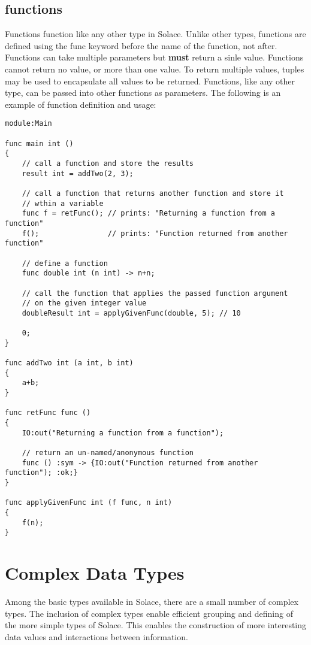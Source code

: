 \documentclass{article}
\begin{document}
\subsection{functions}

Functions function like any other type in Solace. Unlike other types, functions are
defined using the func keyword before the name of the function, not after. Functions
can take multiple parameters but \textbf{must} return a sinle value. Functions cannot return
no value, or more than one value. To return multiple values, tuples may be used to
encapsulate all values to be returned.
Functions, like any other type, can be passed into other functions as parameters.
The following is an example of function definition and usage:

\begin{lstlisting}
module:Main

func main int ()
{
	// call a function and store the results
	result int = addTwo(2, 3);
	
	// call a function that returns another function and store it
	// wthin a variable
	func f = retFunc(); // prints: "Returning a function from a function"
	f();		    	// prints: "Function returned from another function"
	
	// define a function
	func double int (n int) -> n+n;
	
	// call the function that applies the passed function argument
	// on the given integer value
	doubleResult int = applyGivenFunc(double, 5); // 10
	
	0;
}

func addTwo int (a int, b int)
{
	a+b;
}

func retFunc func ()
{
	IO:out("Returning a function from a function");
	
	// return an un-named/anonymous function
	func () :sym -> {IO:out("Function returned from another function"); :ok;}
}

func applyGivenFunc int (f func, n int)
{
	f(n);
}
\end{lstlisting}

\section{Complex Data Types}

Among the basic types available in Solace, there are a small number of complex types. The inclusion
of complex types enable efficient grouping and defining of the more simple types of Solace. This
enables the construction of more interesting data values and interactions between information.
\end{document}
